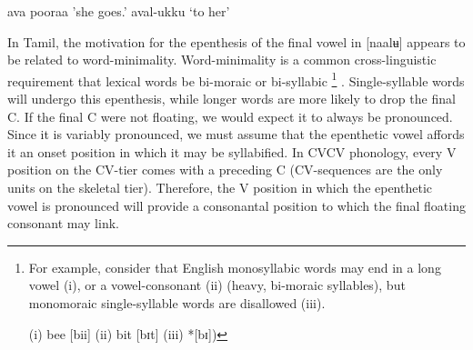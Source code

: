 \documentclass[output=paper,colorlinks,citecolor=brown,
]{langscibook}
\begin{document}
\begin{exe}
\ex \label{new20}
\begin{xlist}
\ex \label{new20a}
ava pooraa	\hspace{1.8cm}	'she goes.' 
\ex \label{new20b}
aval-ukku 	\hspace{2cm}	‘to her' 
\end{xlist}
\end{exe}

In Tamil, the motivation for the epenthesis of the final vowel in [naalʉ] appears to be related to word-minimality. Word-minimality is a common cross-linguistic requirement that lexical words be bi-moraic or bi-syllabic \footnote{  For example, consider that English monosyllabic words may end in a long vowel (i), or a vowel-consonant (ii) (heavy, bi-moraic syllables), but monomoraic single-syllable words are disallowed (iii). 

(i)	bee [bii]	\hspace{1cm}	(ii) 	bit [bɪt]	\hspace{1cm}	(iii)	*[bɪ])

} .  Single-syllable words will undergo this epenthesis, while longer words are more likely to drop the final C. If the final C were not floating, we would expect it to always be pronounced. Since it is variably pronounced, we must assume that the epenthetic vowel affords it an onset position in which it may be syllabified. In CVCV phonology, every V position on the CV-tier comes with a preceding C (CV-sequences are the only units on the skeletal tier). Therefore, the V position in which the epenthetic vowel is pronounced will provide a consonantal position to which the final floating consonant may link. 
\end{document}
